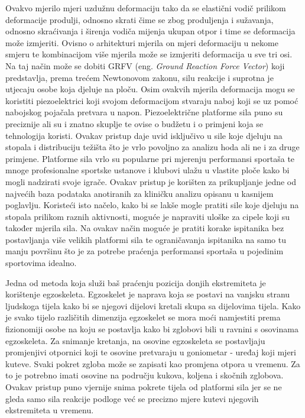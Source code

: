 \documentclass[times, utf8, diplomski]{fer}
\begin{document}
Ovakvo mjerilo mjeri uzdužnu deformaciju tako da se elastični vodič prilikom deformacije produlji, odnosno skrati
čime se zbog produljenja i sužavanja, odnosno skraćivanja i širenja vodiča mijenja ukupan otpor i time se deformacija može izmjeriti.
Ovisno o arhitekturi mjerila on mjeri deformaciju u nekome smjeru te kombinacijom više mjerila može se izmjeriti deformacija
u sve tri osi. Na taj način može se dobiti GRFV (eng. \textit{Ground Reaction Force Vector}) koji predstavlja, prema trećem Newtonovom zakonu,
silu reakcije i suprotna je utjecaju osobe koja djeluje na ploču. Osim ovakvih mjerila deformacija mogu se koristiti piezoelektrici
koji svojom deformacijom stvaraju naboj koji se uz pomoć nabojskog pojačala pretvara u napon. Piezoelektrične platforme sila puno su preciznije ali su
i znatno skuplje te ovise o budžetu i o primjeni koja se tehnologija koristi. Ovakav pristup daje uvid isključivo u sile koje
djeluju na stopala i distribuciju težišta što je vrlo povoljno za analizu hoda ali ne i za druge primjene. Platforme sila vrlo su popularne
pri mjerenju performansi sportaša te mnoge profesionalne sportske ustanove i klubovi ulažu u vlastite ploče kako bi mogli nadzirati
svoje igrače. Ovakav pristup je korišten za prikupljanje jedne od najvećih baza podataka anotiranih za kliničku analizu \citep{pressurePlate}
opisanu u kasnijem poglavlju. Koristeći isto načelo, kako bi se lakše mogle pratiti sile koje djeluju na stopala prilikom
raznih aktivnosti, moguće je napraviti uloške za cipele koji su također mjerila sila. Na ovakav način moguće je pratiti korake
ispitanika bez postavljanja više velikih platformi sila te ograničavanja ispitanika na samo tu manju površinu što je za potrebe
praćenja performansi sportaša u pojedinim sportovima idealno.

Jedna od metoda koja služi baš praćenju pozicija donjih ekstremiteta je korištenje egzoskeleta. Egzoskelet je naprava koja se
postavi na vanjsku stranu ljudskoga tijela kako bi se njegovi dijelovi kretali skupa sa dijelovima tijela. Kako je svako tijelo
različitih dimenzija egzoskelet se mora moći namjestiti prema fizionomiji osobe na koju se postavlja kako bi zglobovi bili u
ravnini s osovinama egzoskeleta. Za snimanje kretanja, na osovine egzoskeleta se postavljaju promjenjivi otpornici koji te osovine
pretvaraju u goniometar - uređaj koji mjeri kuteve. Svaki pokret zgloba može se zapisati kao promjena otpora u vremenu. Za to je
potrebno imati osovine na području kukova, koljena i skočnih zglobova. Ovakav pristup puno vjernije snima pokrete tijela od platformi sila
jer se ne gleda samo sila reakcije podloge već se precizno mjere kutevi njegovih ekstremiteta u vremenu. 
\end{document}
